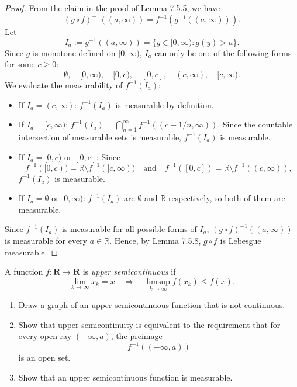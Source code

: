 \begin{proof}
    From the claim in the proof of Lemma 7.5.5, we have
    \[
    (g \circ f)^{-1}((a, \infty)) = f^{-1}(g^{-1}((a, \infty))).
    \]
    Let
    \[
    I_a := g^{-1}((a, \infty)) = \{y \in [0, \infty) : g(y) > a\}.
    \]
    Since $g$ is monotone defined on $[0, \infty)$, $I_a$ can only be one of the following forms for some $c \ge 0$:
    \[
    \emptyset, \quad [0, \infty), \quad [0, c), \quad [0, c], \quad (c, \infty), \quad [c, \infty).
    \]
    We evaluate the measurability of $f^{-1}(I_a)$:
    \begin{itemize}
        \item If $I_a = (c, \infty)$: $f^{-1}(I_a)$ is measurable by definition.
        \item If $I_a = [c, \infty)$: $f^{-1}(I_a)= \bigcap_{n=1}^{\infty} f^{-1}((c - 1/n, \infty))$. Since the countable intersection of measurable sets is measurable, $f^{-1}(I_a)$ is measurable.
        \item If $I_a = [0, c) \text{ or } [0, c]$: Since 
        \[
        f^{-1}([0, c))=\mathbb{R} \setminus f^{-1}([c,\infty)) \quad \text{and} \quad f^{-1}([0, c])=\mathbb{R} \setminus f^{-1}((c,\infty)),
        \]
        $f^{-1}(I_a)$ is measurable.
        \item If $I_a = \emptyset \text{ or } [0, \infty)$: $f^{-1}(I_a)$ are $\emptyset$ and $\mathbb{R}$ respectively, so both of them are measurable.
    \end{itemize}
    Since $f^{-1}(I_a)$ is measurable for all possible forms of $I_a$, $(g \circ f)^{-1}((a, \infty))$ is measurable for every $a \in \mathbb{R}$. Hence, by Lemma 7.5.8, $g \circ f$ is Lebesgue measurable.    
\end{proof}

\begin{problem}
    A function \(f:\mathbf{R}\to \mathbf{R}\) is \emph{upper semicontinuous} if
    \[
    \lim_{k\to\infty} x_k=x
    \quad\Longrightarrow\quad
    \limsup_{k\to\infty} f(x_k)\le f(x).
    \]
    
    
    \begin{enumerate}
        \item[(a)] Draw a graph of an upper semicontinuous function that is not continuous.
        
        \item[(b)] Show that upper semicontinuity is equivalent to the requirement that for every open ray \((-\infty,a)\), the preimage
        \[
        f^{-1}((-\infty,a))
        \]
        is an open set.
         \item[(c)] Show that an upper semicontinuous function is measurable.
        
    \end{enumerate}
\end{problem}

